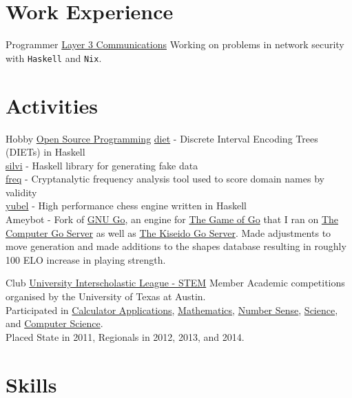 \documentclass[10pt,letterpaper,sans]{moderncv}
\newcommand{\wlink}[2]{\textcolor[HTML]{0020B6}{\href{#1}{#2}}}
\begin{document}
\makecvtitle{}

\section{Work Experience}
        {Programmer}
        {\wlink{https://www.layer3com.com}{Layer 3 Communications}}
        {}{}
        {
Working on problems in network security with \texttt{Haskell} and \texttt{Nix}. 
}

\section{Activities}
        {Hobby}
        {\wlink{https://github.com/chessai}{Open Source Programming}}
        {}{}{
        \wlink{https://github.com/chessai/diet}{diet} - Discrete Interval Encoding Trees (DIETs) in Haskell \\ 
        \wlink{https://github.com/chessai/silvi}{silvi} - Haskell library for generating fake data \\
        \wlink{https://github.com/chessai/freq}{freq} - Cryptanalytic frequency analysis tool used to score domain names by validity \\
        \wlink{https://github.com/chessai/yubel}{yubel} - High performance chess engine written in Haskell \\
        Ameybot - Fork of \wlink{https://www.gnu.org/software/gnugo/}{GNU Go}, an engine for \wlink{https://en.wikipedia.org/wiki/Go_(game)}{The Game of Go} that I ran on \wlink{http://yss-aya.com/cgos/}{The Computer Go Server} as well as \wlink{https://www.gokgs.com/}{The Kiseido Go Server}. Made adjustments to move generation and made additions to the shapes database resulting in roughly 100 ELO increase in playing strength. \\
}

        {Club}
        {\wlink{http://www.uiltexas.org/academics/stem}{University Interscholastic League - STEM}}
        {Member}{}{
        Academic competitions organised by the University of Texas at Austin. \\ %
        Participated in %
        \wlink{http://www.uiltexas.org/academics/stem/calculator-applications}{Calculator Applications}, %
        \wlink{http://www.uiltexas.org/academics/stem/mathematics}{Mathematics}, %
        \wlink{http://www.uiltexas.org/academics/stem/number-sense}{Number Sense}, %
        \wlink{http://www.uiltexas.org/academics/stem/science}{Science}, and %
        \wlink{http://www.uiltexas.org/academics/stem/computer-science}{Computer Science}. \\ %
        Placed State in 2011, Regionals in 2012, 2013, and 2014.
}

\vspace{1em}

\section{Skills}
\end{document}
